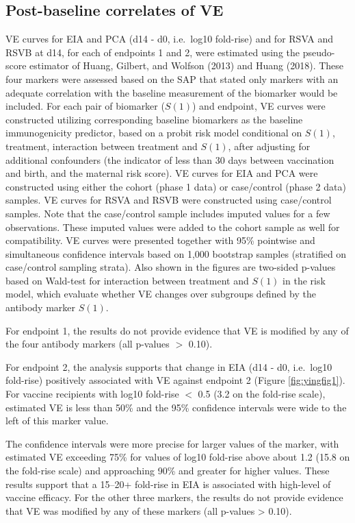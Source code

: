 \documentclass[11pt]{article}
\begin{document}
\clearpage

\hypertarget{post-baseline-correlates-of-ve}{%
\subsection{Post-baseline correlates of VE}\label{post-baseline-correlates-of-ve}}

VE curves for EIA and PCA (d14 - d0, i.e.~log10 fold-rise) and for RSVA and RSVB at d14, for each of endpoints 1 and 2, were estimated using the pseudo-score estimator of Huang, Gilbert, and Wolfson (2013) and Huang (2018). These four markers were assessed based on the SAP that stated only markers with an adequate correlation with the baseline measurement of the biomarker would be included. For each pair of biomarker (\(S(1)\)) and endpoint, VE curves were constructed utilizing corresponding baseline biomarkers as the baseline immunogenicity predictor, based on a probit risk model conditional on \(S(1)\), treatment, interaction between treatment and \(S(1)\), after adjusting for additional confounders (the indicator of less than 30 days between vaccination and birth, and the maternal risk score).
VE curves for EIA and PCA were constructed using either the cohort (phase 1 data) or case/control (phase 2 data) samples. VE curves for RSVA and RSVB were constructed using case/control samples. Note that the case/control sample includes imputed values for a few observations. These imputed values were added to the cohort sample as well for compatibility. VE curves were presented together with 95\% pointwise and simultaneous confidence intervals based on 1,000 bootstrap samples (stratified on case/control sampling strata). Also shown in the figures are two-sided p-values based on Wald-test for interaction between treatment and \(S(1)\) in the risk model, which evaluate whether VE changes over subgroups defined by the antibody marker \(S(1)\).

For endpoint 1, the results do not provide evidence that VE is modified by any of the four antibody markers (all p-values \(>\) 0.10).

For endpoint 2, the analysis supports that change in EIA (d14 - d0, i.e.~log10 fold-rise) positively associated with VE against endpoint 2 (Figure \ref{fig:yingfig1}).
For vaccine recipients with log10 fold-rise \(<\) 0.5 (3.2 on the fold-rise scale), estimated VE is less than 50\% and the 95\% confidence intervals were wide to the left of this marker value.

The confidence intervals were more precise for larger values of the marker, with estimated VE exceeding 75\% for values of log10 fold-rise above about 1.2 (15.8 on the fold-rise scale) and approaching 90\% and greater for higher values. These results support that a 15--20+ fold-rise in EIA is associated with high-level of vaccine efficacy. For the other three markers, the results do not provide evidence that VE was modified by any of these markers (all p-values \textgreater{} 0.10).
\end{document}
